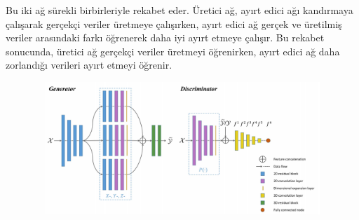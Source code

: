 \documentclass[12pt]{article}
\begin{document}
Bu iki ağ sürekli birbirleriyle rekabet eder. Üretici ağ, ayırt edici ağı kandırmaya çalışarak gerçekçi veriler üretmeye çalışırken, ayırt edici ağ gerçek ve üretilmiş veriler arasındaki farkı öğrenerek daha iyi ayırt etmeye çalışır. Bu rekabet sonucunda, üretici ağ gerçekçi veriler üretmeyi öğrenirken, ayırt edici ağ daha zorlandığı verileri ayırt etmeyi öğrenir.\cite{githubhairgan}
\begin{figure}[h]
    \centering
    \includegraphics[width=3\textwidth, height=5cm, keepaspectratio]{NetworkOverview.png}
    \label{fig:enter-label}
\end{figure}\\
\end{document}
